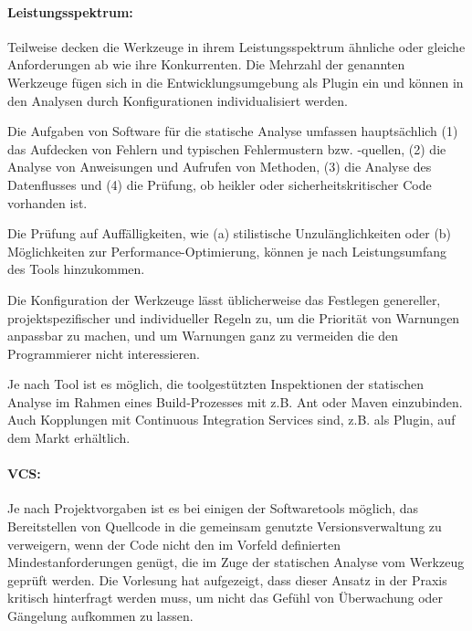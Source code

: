 \paragraph{Leistungsspektrum:} Teilweise decken die Werkzeuge in ihrem Leistungsspektrum ähnliche oder gleiche Anforderungen ab wie ihre Konkurrenten. Die Mehrzahl der genannten Werkzeuge fügen sich in die Entwicklungsumgebung als Plugin ein und können in den Analysen durch Konfigurationen individualisiert werden. 

Die Aufgaben von Software für die statische Analyse umfassen hauptsächlich (1) das Aufdecken von Fehlern und typischen Fehlermustern bzw. -quellen, (2) die Analyse von Anweisungen und Aufrufen von Methoden, (3) die Analyse des Datenflusses und (4) die Prüfung, ob heikler oder sicherheitskritischer Code vorhanden ist. 

Die Prüfung auf Auffälligkeiten, wie (a) stilistische Unzulänglichkeiten oder (b) Möglichkeiten zur Performance-Optimierung, können je nach Leistungsumfang des Tools hinzukommen.

Die Konfiguration der Werkzeuge lässt üblicherweise das Festlegen genereller, projektspezifischer und individueller Regeln zu, um die Priorität von Warnungen anpassbar zu machen, und um Warnungen ganz zu vermeiden die den Programmierer nicht interessieren.

Je nach Tool ist es möglich, die toolgestützten Inspektionen der statischen Analyse im Rahmen eines Build-Prozesses mit z.B. Ant oder Maven einzubinden. Auch Kopplungen mit Continuous Integration Services sind, z.B. als Plugin, auf dem Markt erhältlich.

\paragraph{VCS:} Je nach Projektvorgaben ist es bei einigen der Softwaretools möglich, das Bereitstellen von Quellcode in die gemeinsam genutzte Versionsverwaltung zu verweigern, wenn der Code nicht den im Vorfeld definierten Mindestanforderungen genügt, die im Zuge der statischen Analyse vom Werkzeug geprüft werden. Die Vorlesung hat aufgezeigt, dass dieser Ansatz in der Praxis kritisch hinterfragt werden muss, um nicht das Gefühl von Überwachung oder Gängelung aufkommen zu lassen.
